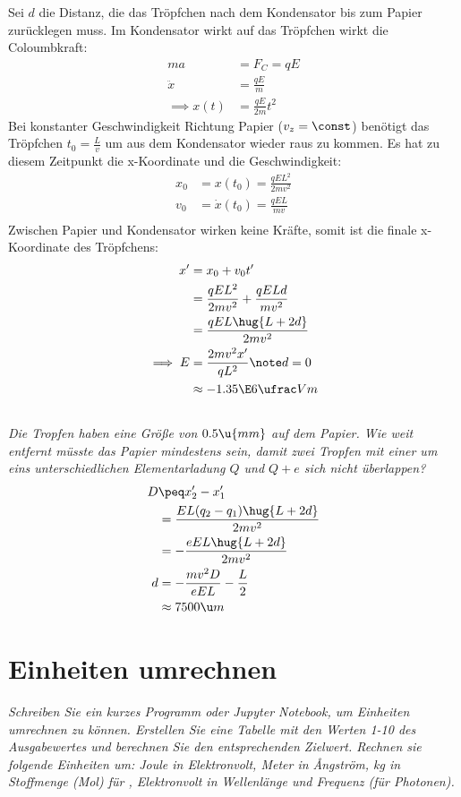 \documentclass[ex,minted,hatbasis]{exercise_4.0}
\begin{document}
Sei $d$ die Distanz, die das Tröpfchen nach dem Kondensator bis zum Papier zurücklegen muss. Im Kondensator wirkt auf das Tröpfchen wirkt die Coloumbkraft:
\begin{align*}
    m a &= F_C = q E\\
    \ddot x &= \frac{qE}{m}\\
    \implies x(t) &= \frac{qE}{2m} t^2
\end{align*}
Bei konstanter Geschwindigkeit Richtung Papier ($v_z = \const$) benötigt das Tröpfchen $t_0 = \frac{L}{v}$ um aus dem Kondensator wieder raus zu kommen.
Es hat zu diesem Zeitpunkt die x-Koordinate und die Geschwindigkeit:
\begin{align*}
    x_0 &= x(t_0) = \frac{q E L^2}{2 m v^2}\\
    v_0 &= \dot x(t_0) = \frac{q E L}{m v}\\
\end{align*}
Zwischen Papier und Kondensator wirken keine Kräfte, somit ist die finale x-Koordinate des Tröpfchens:
\begin{align*}
    x' &= x_0 + v_0 t'\\ 
     &= \frac{q E L^2}{2 m v^2} + \frac{q E L d}{m v^2}\\
     &= \frac{q E L \hug{L + 2d}}{2m v^2}\\
     \implies E &= \frac{2m v^2 x'}{q L^2} \note d=0\\
     &\approx -1.35 \E6\ufrac Vm
\end{align*}


\subsection{}
{\it Die Tropfen haben eine Größe von $0.5 \u{mm}$ auf dem Papier. Wie weit entfernt müsste das Papier mindestens sein, damit zwei Tropfen mit einer um eins unterschiedlichen Elementarladung $Q$ und $Q + e$ sich nicht überlappen?}\vspace{2ex}
\begin{align*}
    D &\peq x_2' - x_1' \\
    &= \frac{E L (q_2 - q_1)\hug{L + 2d}}{2m v^2}\\
    &= -\frac{e E L\hug{L + 2d}}{2m v^2}\\
    d &= -\frac{m v^2 D}{e E L} - \frac L2\\
    &\approx 7500 \u m
\end{align*}

\section{Einheiten umrechnen}
\textit{Schreiben Sie ein kurzes Programm oder Jupyter Notebook, um Einheiten umrechnen zu können. Erstellen
Sie eine Tabelle mit den Werten 1-10 des Ausgabewertes und berechnen Sie den entsprechenden Zielwert. Rechnen sie folgende Einheiten um: Joule in Elektronvolt, Meter in Ångström, kg in Stoffmenge (Mol) für , 
Elektronvolt in Wellenlänge und Frequenz (für Photonen).}\vspace{1ex}
\end{document}
